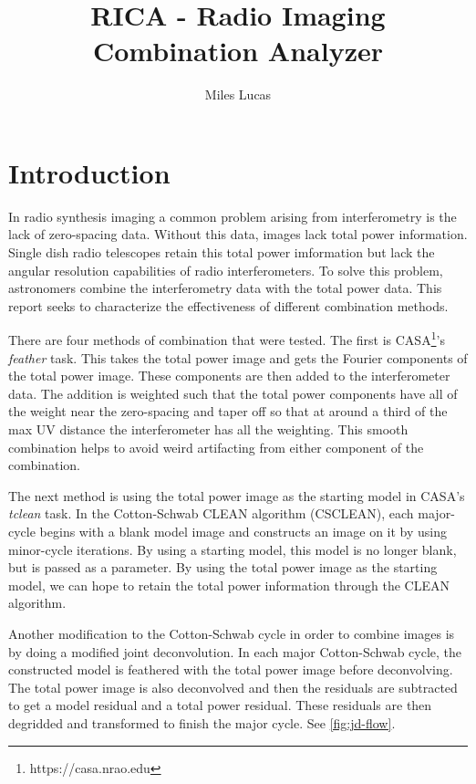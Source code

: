 \documentclass[manuscript,linenumbers]{aastex62}
\begin{document}
\title{RICA - Radio Imaging Combination Analyzer}
\author{Miles Lucas}
 

\begin{abstract}

\end{abstract}

\section{Introduction}

In radio synthesis imaging a common problem arising from interferometry is the lack of zero-spacing data. Without this data, images lack total power information. Single dish radio telescopes retain this total power imformation but lack the angular resolution capabilities of radio interferometers. To solve this problem, astronomers combine the interferometry data with the total power data. This report seeks to characterize the effectiveness of different combination methods.

There are four methods of combination that were tested. The first is CASA\footnote{https://casa.nrao.edu}'s \textit{feather} task. This takes the total power image and gets the Fourier components of the total power image. These components are then added to the interferometer data. The addition is weighted such that the total power components have all of the weight near the zero-spacing and taper off so that at around a third of the max UV distance the interferometer has all the weighting. This smooth combination helps to avoid weird artifacting from either component of the combination.

The next method is using the total power image as the starting model in CASA's \textit{tclean} task. In the Cotton-Schwab CLEAN algorithm (CSCLEAN), each major-cycle begins with a blank model image and constructs an image on it by using minor-cycle iterations. By using a starting model, this model is no longer blank, but is passed as a parameter. By using the total power image as the starting model, we can hope to retain the total power information through the CLEAN algorithm.


Another modification to the Cotton-Schwab cycle in order to combine images is by doing a modified joint deconvolution. In each major Cotton-Schwab cycle, the constructed model is feathered with the total power image before deconvolving. The total power image is also deconvolved and then the residuals are subtracted to get a model residual and a total power residual. These residuals are then degridded and transformed to finish the major cycle. See \autoref{fig:jd-flow}.
\end{document}
